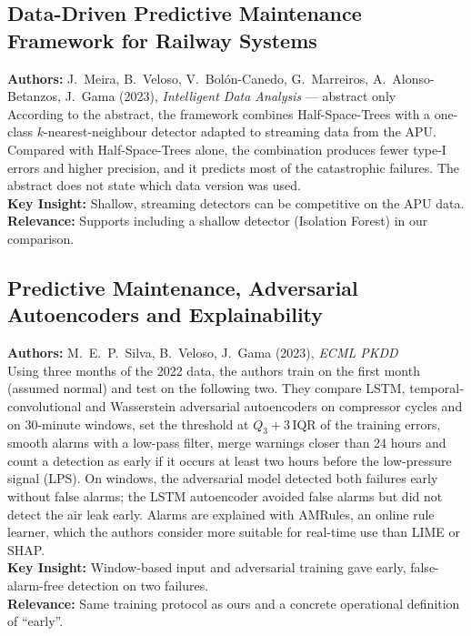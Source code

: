 \subsection[Meira et al. (2023): Data-Driven PdM Framework]{Data-Driven Predictive Maintenance Framework for Railway Systems}
\textbf{Authors:} J.~Meira, B.~Veloso, V.~Bol\'on-Canedo, G.~Marreiros, A.~Alonso-Betanzos, J.~Gama (2023), \textit{Intelligent Data Analysis} \cite{meira2023framework} --- abstract only\\
According to the abstract, the framework combines Half-Space-Trees with a one-class $k$-nearest-neighbour detector adapted to streaming data from the APU. Compared with Half-Space-Trees alone, the combination produces fewer type-I errors and higher precision, and it predicts most of the catastrophic failures. The abstract does not state which data version was used.\\
\textbf{Key Insight:} Shallow, streaming detectors can be competitive on the APU data.\\
\textbf{Relevance:} Supports including a shallow detector (Isolation Forest) in our comparison.

\subsection[Silva et al. (2023): Adversarial Autoencoders and Explainability]{Predictive Maintenance, Adversarial Autoencoders and Explainability}
\textbf{Authors:} M.~E.~P.~Silva, B.~Veloso, J.~Gama (2023), \textit{ECML PKDD} \cite{silva2023adversarial}\\
Using three months of the 2022 data, the authors train on the first month (assumed normal) and test on the following two. They compare LSTM, temporal-convolutional and Wasserstein adversarial autoencoders on compressor cycles and on 30-minute windows, set the threshold at $Q_3 + 3\,\mathrm{IQR}$ of the training errors, smooth alarms with a low-pass filter, merge warnings closer than 24 hours and count a detection as early if it occurs at least two hours before the low-pressure signal (LPS). On windows, the adversarial model detected both failures early without false alarms; the LSTM autoencoder avoided false alarms but did not detect the air leak early. Alarms are explained with AMRules, an online rule learner, which the authors consider more suitable for real-time use than LIME or SHAP.\\
\textbf{Key Insight:} Window-based input and adversarial training gave early, false-alarm-free detection on two failures.\\
\textbf{Relevance:} Same training protocol as ours and a concrete operational definition of ``early''.

